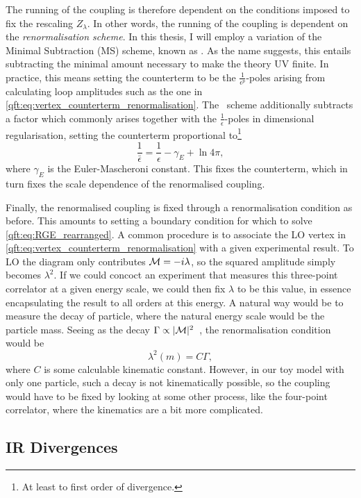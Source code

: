 \documentclass[../main.tex]{subfiles}
\begin{document}
The running of the coupling is therefore dependent on the conditions imposed to fix the rescaling \(Z_\lambda\).
In other words, the running of the coupling is dependent on the \emph{renormalisation scheme}.
In this thesis, I will employ a variation of the Minimal Subtraction (MS) scheme, known as \MSbar\@.
As the name suggests, this entails subtracting the minimal amount necessary to make the theory UV finite.
In practice, this means setting the counterterm to be the \(\frac{1}{\epsilon^p}\)-poles arising from calculating loop amplitudes such as the one in \cref{qft:eq:vertex_counterterm_renormalisation}.
The \MSbar\ scheme additionally subtracts a factor which commonly arises together with the \(\frac{1}{\epsilon}\)-poles in dimensional regularisation, setting the counterterm proportional to\footnote{At least to first order of divergence.}
\begin{equation}
  \frac{1}{\bar\epsilon} = \frac{1}{\epsilon} - \gamma_E + \ln 4\pi,
\end{equation}
where \(\gamma_E\) is the Euler-Mascheroni constant.
This fixes the counterterm, which in turn fixes the scale dependence of the renormalised coupling.
\medskip

Finally, the renormalised coupling is fixed through a renormalisation condition as before.
This amounts to setting a boundary condition for which to solve \cref{qft:eq:RGE_rearranged}.
A common procedure is to associate the LO vertex in \cref{qft:eq:vertex_counterterm_renormalisation} with a given experimental result.
To LO the diagram only contributes \(\mathcal{M} = -i\lambda\), so the squared amplitude simply becomes \(\lambda^2\).
If we could concoct an experiment that measures this three-point correlator at a given energy scale, we could then fix \(\lambda\) to be this value, in essence encapsulating the result to all orders at this energy.
A natural way would be to measure the decay of particle, where the natural energy scale would be the particle mass.
Seeing as the decay \(\Gamma \propto |\mathcal{M}|^2\)~\cite{Schwartz:2014sze}, the renormalisation condition would be
\begin{equation}
  \lambda^2(m) = C \Gamma,
\end{equation}
where \(C\) is some calculable kinematic constant.
However, in our toy model with only one particle, such a decay is not kinematically possible, so the coupling would have to be fixed by looking at some other process, like the four-point correlator, where the kinematics are a bit more complicated.


\subsection{IR Divergences}
\end{document}
